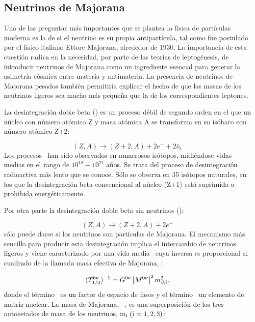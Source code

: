 \subsection*{Neutrinos de Majorana}
Una de las preguntas más importantes que se plantea la física de partículas moderna es la de si el neutrino es su propia antipartícula, tal como fue postulado por el físico italiano Ettore Majorana, alrededor de 1930. La importancia de esta cuestión radica en la necesidad, por parte de las teorías de leptogénesis, de introducir neutrinos de Majorana como un ingrediente esencial para generar la asimetría cósmica entre materia y antimateria. La presencia de neutrinos de Majorana pesados también permitiría explicar el hecho de que las masas de los neutrinos ligeros sea mucho más pequeña que la de los correspondientes leptones. 

La desintegración doble beta (\bb) es un proceso débil de segundo orden en el que un núcleo con número atómico Z y masa atómica A se transforma en su isóbaro con número atómico 
Z+2:

\begin{equation}
(Z,A) \rightarrow (Z+2,A) + 2 e^- + 2 \bar{\nu}_e 
\end{equation}
%                                     
Los procesos \bb\ han sido observados en numerosos isótopos, midiéndose vidas medias en el rango de $10^{18} - 10^{21}$ años. Se trata del proceso de desintegración radioactiva más lento que se conoce. Sólo se observa en 35 isótopos naturales, en los que la desintegración beta convencional al núcleo (Z+1) está suprimida o prohibida energéticamente. 

Por otra parte la desintegración doble beta sin neutrinos (\bbonu):
                                     
\begin{equation}
(Z,A) \rightarrow (Z+2,A) + 2 e^- 
\end{equation}
sólo puede darse si los neutrinos son partículas de Majorana. El mecanismo más sencillo para producir esta desintegración implica el intercambio de neutrinos ligeros y viene caracterizado por una vida media \Tonu\ cuya inversa es proporcional al cuadrado de la llamada masa efectiva de Majorana, \mbb: 
                                    
\begin{equation}
(T_{1/2}^{0\nu})^{-1} =G^{0\nu} \left|M^{0\nu}\right|^2 m_{\beta\beta}^2 ,
\label{eq.t0nu}
\end{equation}
%  
donde el término \Gonu\ es un factor de espacio de fases y el término \Monu\ un elemento de matriz nuclear. La masa  de Majorana, \mbb\ , es una superposición de los tres autoestados de masa de los neutrinos, ${\rm m_i ~(i=1,2,3)} $: 
                                    
